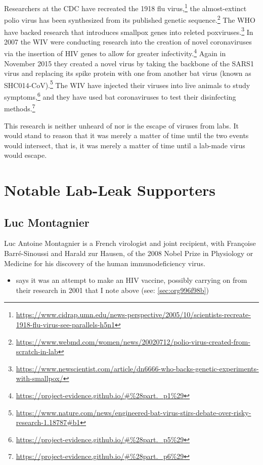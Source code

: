 \documentclass[11pt]{article}
\begin{document}
Researchers at the CDC have recreated the 1918 flu virus,\footnote{\url{https://www.cidrap.umn.edu/news-perspective/2005/10/scientists-recreate-1918-flu-virus-see-parallels-h5n1}} the almost-extinct polio virus has been synthesized from its published genetic sequence.\footnote{\url{https://www.webmd.com/women/news/20020712/polio-virus-created-from-scratch-in-lab}} The WHO have backed research that introduces smallpox genes into releted poxviruses.\footnote{\url{https://www.newscientist.com/article/dn6666-who-backs-genetic-experiments-with-smallpox/}} In 2007 the WIV were conducting research into the creation of novel coronaviruses via the insertion of HIV genes to allow for greater infectivity.\footnote{\url{https://project-evidence.github.io/\#\%28part.\_p1\%29}} Again in November 2015 they created a novel virus by taking the backbone of the SARS1 virus and replacing its spike protein with one from another bat virus (known as SHC014-CoV).\footnote{\url{https://www.nature.com/news/engineered-bat-virus-stirs-debate-over-risky-research-1.18787\#b1}} The WIV have injected their viruses into live animals to study symptoms,\footnote{\url{https://project-evidence.github.io/\#\%28part.\_p5\%29}} and they have used bat coronaviruses to test their disinfecting methods.\footnote{\url{https://project-evidence.github.io/\#\%28part.\_p6\%29}}

This research is neither unheard of nor is the escape of viruses from labs. It would stand to reason that it was merely a matter of time until the two events would intersect, that is, it was merely a matter of time until a lab-made virus would escape.
\section{Notable Lab-Leak Supporters}
\label{sec:org8a6f2c2}
\subsection{Luc Montagnier}
\label{sec:org9adbbf2}
Luc Antoine Montagnier is a French virologist and joint recipient, with Françoise Barré-Sinoussi and Harald zur Hausen, of the 2008 Nobel Prize in Physiology or Medicine for his discovery of the human immunodeficiency virus.
\begin{itemize}
\item says it was an attempt to make an HIV vaccine, possibly carrying on from their research in 2001 that I note above (see: \ref{sec:org996f98b})
\end{itemize}
\end{document}
